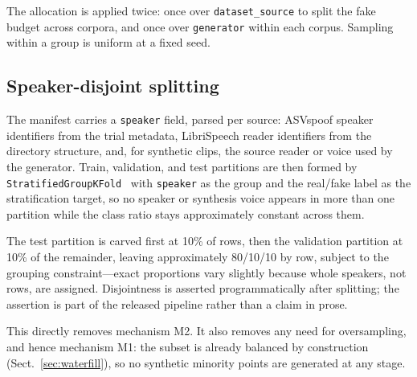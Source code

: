 \documentclass[sn-mathphys-num,pdflatex]{sn-jnl}
\begin{document}
The allocation is applied twice: once over \texttt{dataset\_source} to split the
fake budget across corpora, and once over \texttt{generator} within each corpus.
Sampling within a group is uniform at a fixed seed.

\subsection{Speaker-disjoint splitting}\label{sec:split}

The manifest carries a \texttt{speaker} field, parsed per source: ASVspoof
speaker identifiers from the trial metadata, LibriSpeech reader identifiers from
the directory structure, and, for synthetic clips, the source reader or voice
used by the generator. Train, validation, and test partitions are then formed by
\texttt{StratifiedGroupKFold}~\cite{sklearn} with \texttt{speaker} as the group
and the real/fake label as the stratification target, so no speaker or
synthesis voice appears in more than one partition while the class ratio stays
approximately constant across them.

The test partition is carved first at 10\% of rows, then the validation
partition at 10\% of the remainder, leaving approximately 80/10/10 by row,
subject to the grouping constraint---exact proportions vary slightly because
whole speakers, not rows, are assigned. Disjointness is asserted programmatically
after splitting; the assertion is part of the released pipeline rather than a
claim in prose.

This directly removes mechanism M2. It also removes any need for oversampling,
and hence mechanism M1: the subset is already balanced by construction
(Sect.~\ref{sec:waterfill}), so no synthetic minority points are generated at
any stage.
\end{document}
